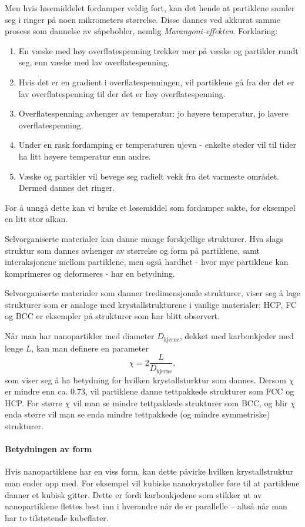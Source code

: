Men hvis løsemiddelet fordamper veldig fort, kan det hende at partiklene samler seg i ringer på noen mikrometers størrelse. Disse dannes ved akkurat samme prosess som dannelse av såpebobler, nemlig \emph{Marangoni-effekten}. Forklaring:
\begin{enumerate}
	\item En væske med høy overflatespenning trekker mer på væske og partikler rundt seg, enn væske med lav overflatespenning.
	\item Hvis det er en gradient i overflatespenningen, vil partiklene gå fra der det er lav overflatespenning til der det er høy overflatespenning.
	\item Overflatespenning avhenger av temperatur: jo høyere temperatur, jo lavere overflatespenning.
	\item Under en rask fordamping er temperaturen ujevn - enkelte steder vil til tider ha litt høyere temperatur enn andre.
	\item Væske og partikler vil bevege seg radielt vekk fra det varmeste området. Dermed dannes det ringer.
\end{enumerate}
For å unngå dette kan vi bruke et løsemiddel som fordamper sakte, for eksempel en litt stor alkan.

\vfill
{}
Selvorganiserte materialer kan danne mange forskjellige strukturer. Hva slags struktur som dannes avhenger av størrelse og form på partiklene, samt interaksjonene mellom partiklene, men også hardhet - hvor mye partiklene kan komprimeres og deformeres - har en betydning.

Selvorganiserte materialer som danner tredimensjonale strukturer, viser seg å lage strukturer som er analoge med krystallstrukturene i vanlige materialer: HCP, FC og BCC er eksempler på strukturer som har blitt observert. 

Når man har nanopartikler med diameter $D_{\text{kjerne}}$, dekket med karbonkjeder med lenge $L$, kan man definere en parameter
\begin{equation}
	\chi = 2\frac{L}{D_{\text{kjerne}}},
\end{equation}
som viser seg å ha betydning for hvilken krystallsturktur som dannes. Dersom $\chi$ er mindre enn ca. 0.73, vil partiklene danne tettpakkede strukturer som FCC og HCP. For større $\chi$ vil man se mindre tettpakkede strukturer som BCC, og blir $\chi$ enda større vil man se enda mindre tettpakkede (og mindre symmetriske) strukturer.

\paragraph{Betydningen av form} Hvis nanopartiklene har en viss form, kan dette påvirke hvilken krystallstruktur man ender opp med. For eksempel vil kubiske nanokrystaller føre til at partiklene danner et kubisk gitter. Dette er fordi karbonkjedene som stikker ut av nanopartiklene flettes best inn i hverandre når de er parallelle -- altså når man har to tilstøtende kubeflater.

